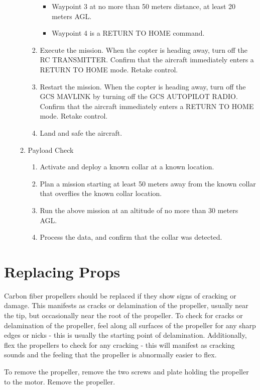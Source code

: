 \documentclass{report}
\begin{document}
\begin{enumerate}
\begin{enumerate}
\begin{enumerate}
\begin{itemize}
									\item Waypoint 3 at no more than 50 meters distance, at least 20 meters AGL.
									\item Waypoint 4 is a RETURN TO HOME command.
								\end{itemize}
							\item Execute the mission.  When the copter is heading away, turn off the RC TRANSMITTER.  Confirm that the aircraft immediately enters a RETURN TO HOME mode.  Retake control.
							\item Restart the mission.  When the copter is heading away, turn off the GCS MAVLINK by turning off the GCS AUTOPILOT RADIO.  Confirm that the aircraft immediately enters a RETURN TO HOME mode.  Retake control.
							\item Land and safe the aircraft.
						\end{enumerate}
					\item Payload Check
						\begin{enumerate}
							\item Activate and deploy a known collar at a known location.
							\item Plan a mission starting at least 50 meters away from the known collar that overflies the known collar location.
							\item Run the above mission at an altitude of no more than 30 meters AGL.
							\item Process the data, and confirm that the collar was detected.
						\end{enumerate}
				\end{enumerate}
		\end{enumerate}
	\section{Replacing Props}
		Carbon fiber propellers should be replaced if they show signs of cracking or damage.  This manifests as cracks or delamination of the propeller, usually near the tip, but occasionally near the root of the propeller.  To check for cracks or delamination of the propeller, feel along all surfaces of the propeller for any sharp edges or nicks - this is usually the starting point of delamination.  Additionally, flex the propellers to check for any cracking - this will manifest as cracking sounds and the feeling that the propeller is abnormally easier to flex.

		To remove the propeller, remove the two screws and plate holding the propeller to the motor.  Remove the propeller.
\end{document}
